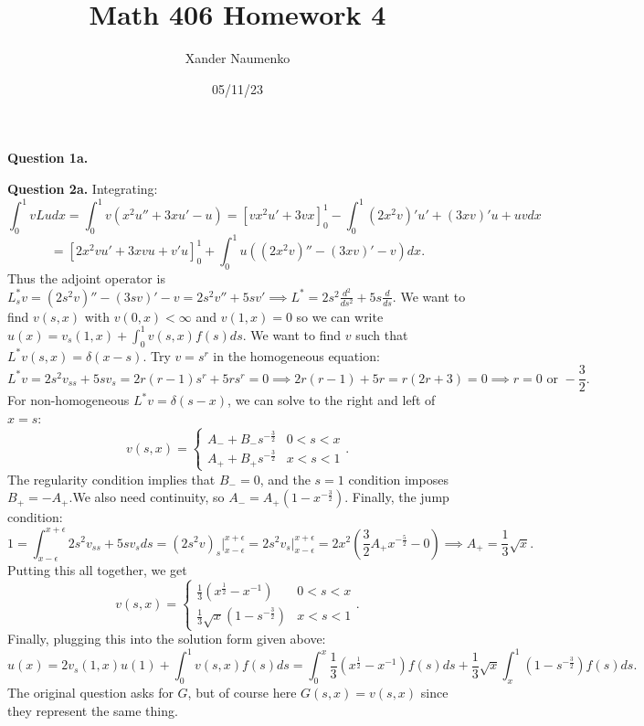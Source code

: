 \documentclass[letterpaper, reqno,11pt]{article}
\begin{document}
\title{Math 406 Homework 4}
\date{05/11/23}
\author{Xander Naumenko}
\maketitle

{\medskip\noindent\bf Question 1a.}  

{\medskip\noindent\bf Question 2a.} Integrating:
\[
\int_{0}^{1}vLudx=\int_{0}^{1}v\left( x^2u''+3xu'-u \right)=\left[ vx^2u'+3vx \right]_0^{1}-\int_0^{1}(2x^2v)'u'+(3xv)'u+uvdx
\]
\[
    =\left[ 2x^2vu'+3xvu+v'u \right]_0^{1}+\int_0^1 u\left( (2x^2v)''-(3xv)'-v \right) dx
.\]
Thus the adjoint operator is $L_s^{*}v=(2s^2v)''-(3sv)'-v=2s^2v''+5sv'\implies L^{*}=2s^2 \frac{d^2}{ds^2}+5s \frac{d}{ds}$. We want to find $v(s,x)$ with $v(0,x)<\infty$ and $v(1,x)=0$ so we can write $u(x)=v_s(1,x)+\int_0^1v(s,x)f(s)ds$. We want to find $v$ such that $L^{*}v(s,x)=\delta(x-s)$. Try $v=s^{r}$ in the homogeneous equation:
\[
L^{*}v=2s^2v_{ss}+5sv_s=2r(r-1)s^{r}+5rs^{r}=0\implies 2r(r-1)+5r=r(2r+3)=0\implies r=0\text{ or }-\frac{3}{2}
.\]
For non-homogeneous $L^{*}v=\delta(s-x)$, we can solve to the right and left of $x=s$:
\[
v(s,x)=\begin{cases}
    A_-+B_-s^{-\frac{3}{2}}&0<s<x\\
    A_++B_+s^{-\frac{3}{2}}&x<s<1
\end{cases}
.\]
The regularity condition implies that $B_-=0$, and the $s=1$ condition imposes $B_+=-A_+$.We also need continuity, so $A_-=A_+(1-x^{-\frac{3}{2}})$. Finally, the jump condition:
\[
    1=\int_{x-\epsilon}^{x+\epsilon}2s^2v_{ss}+5sv_sds=(2s^2v)_s\big|_{x-\epsilon}^{x+\epsilon}=2s^2v_s\big|_{x-\epsilon}^{x+\epsilon}=2x^2\left(\frac{3}{2}A_+x^{-\frac{5}{2}}-0\right)\implies A_+=\frac{1}{3}\sqrt{x}
.\]
Putting this all together, we get
\[
v(s,x)=\begin{cases}
    \frac{1}{3}\left(x^{\frac{1}{2}}-x^{-1}\right)&0<s<x\\
    \frac{1}{3}\sqrt{x}\left( 1-s^{-\frac{3}{2}} \right)&x<s<1
\end{cases}
.\]
Finally, plugging this into the solution form given above:
\[
u(x)=2v_s(1,x)u(1)+\int_{0}^{1}v(s,x)f(s)ds=\int_{0}^{x}\frac{1}{3}\left(x^{\frac{1}{2}}-x^{-1}\right)f(s)ds+\frac{1}{3}\sqrt{x}\int_x^{1}\left(1-s^{-\frac{3}{2}}\right)f(s)ds
.\]
The original question asks for $G$, but of course here $G(s,x)=v(s,x)$ since they represent the same thing.
\end{document}
